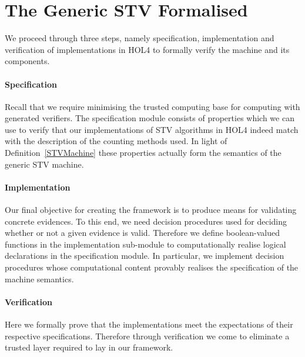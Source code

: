 \documentclass[10pt,conference]{IEEEtran}
\begin{document}
\section{The Generic STV Formalised}\label{sec:GenCertVer}
We proceed through three steps, namely specification, implementation and verification of implementations in HOL4 to formally verify the machine and its components.
\paragraph*{Specification} 
Recall that we require minimising the trusted computing base  for computing with generated verifiers. The specification module consists of properties which we can use to verify that our implementations of  STV algorithms in HOL4 indeed match with the description of the counting methods used.  
 In light of Definition~\ref{STVMachine} these properties   actually form the semantics of the generic STV machine. 
\paragraph*{Implementation} Our final objective for creating the framework is to produce means for validating concrete evidences. To this end, we need decision procedures used for deciding whether or not a given evidence is valid. Therefore we define boolean-valued functions in the implementation sub-module to computationally realise logical declarations in the specification module. In particular, we implement decision procedures whose computational content  provably realises the specification of the machine semantics.  
\paragraph*{Verification} Here we formally prove that the implementations meet the expectations of their respective specifications. Therefore through verification we come to eliminate a trusted layer  required to lay in our framework.  
\end{document}

